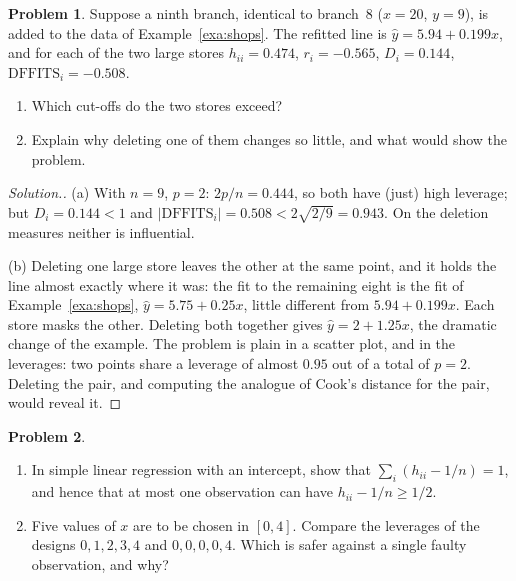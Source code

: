 \documentclass[11pt,a4paper]{article}
\numberwithin{equation}{section}
\theoremstyle{definition}
\newtheorem{problemx}{Problem}[subsection]
\newenvironment{problem}{\begin{problemx}}{\end{problemx}}
\newenvironment{solution}
  {\renewcommand{\qedsymbol}{}\begin{proof}[\textit{Solution}.]}
  {\end{proof}}
\begin{document}
\begin{problem}\label{prob:masking}
Suppose a ninth branch, identical to branch~8 ($x = 20$, $y = 9$), is added to the data of
Example~\ref{exa:shops}. The refitted line is $\hat y = 5.94 + 0.199x$, and for each of the two
large stores $h_{ii} = 0.474$, $r_i = -0.565$, $D_i = 0.144$, $\mathrm{DFFITS}_i = -0.508$.
\begin{enumerate}[label=(\alph*)]
\item Which cut-offs do the two stores exceed?
\item Explain why deleting one of them changes so little, and what would show the
problem.
\end{enumerate}
\end{problem}

\begin{solution}
(a) With $n = 9$, $p = 2$: $2p/n = 0.444$, so both have (just) high leverage; but
$D_i = 0.144 < 1$ and $|\mathrm{DFFITS}_i| = 0.508 < 2\sqrt{2/9} = 0.943$. On the deletion
measures neither is influential.

(b) Deleting one large store leaves the other at the same point, and it holds the line almost
exactly where it was: the fit to the remaining eight is the fit of Example~\ref{exa:shops},
$\hat y = 5.75 + 0.25x$, little different from $5.94 + 0.199x$. Each store masks the other.
Deleting both together gives $\hat y = 2 + 1.25x$, the dramatic change of the example. The
problem is plain in a scatter plot, and in the leverages: two points share a leverage of
almost $0.95$ out of a total of $p = 2$. Deleting the pair, and computing the analogue of
Cook's distance for the pair, would reveal it.
\end{solution}

\begin{problem}\label{prob:leverage-design}
\begin{enumerate}[label=(\alph*)]
\item In simple linear regression with an intercept, show that $\sum_i (h_{ii} - 1/n) = 1$,
and hence that at most one observation can have $h_{ii} - 1/n \ge 1/2$.
\item Five values of $x$ are to be chosen in $[0, 4]$. Compare the leverages of the designs
$0, 1, 2, 3, 4$ and $0, 0, 0, 0, 4$. Which is safer against a single faulty observation, and why?
\end{enumerate}
\end{problem}
\end{document}
